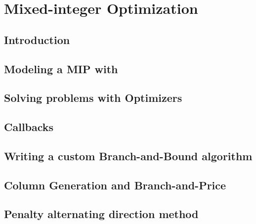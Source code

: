 \part{Mixed-integer Optimization}
\chapter{Introduction}
\chapter{Modeling a MIP with \idol}
\chapter{Solving problems with \textsf{Optimizers}}
\chapter{Callbacks}
\chapter{Writing a custom Branch-and-Bound algorithm}
\chapter{Column Generation and Branch-and-Price}
\chapter{Penalty alternating direction method}
